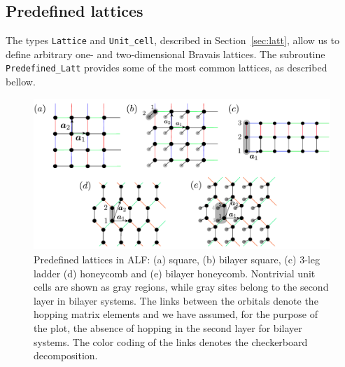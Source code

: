 %
\subsection{Predefined lattices} \label{sec:predefined_lattices}


The types \texttt{Lattice} and \texttt{Unit\_cell}, described in Section~\ref{sec:latt}, allow us to define arbitrary one- and two-dimensional Bravais lattices. The subroutine \texttt{Predefined\_Latt} provides some of the most common lattices, as described bellow.


\begin{figure}
        \begin{center}
                \includegraphics[width=\textwidth]{Figures/Lattices_all.pdf}
               
				
                \caption{Predefined lattices in ALF: (a) square, (b) bilayer square, (c) 3-leg ladder  (d) honeycomb and (e) bilayer honeycomb. Nontrivial unit cells are shown as gray regions, while gray sites belong to the second layer in bilayer systems.   The links between the orbitals denote the hopping matrix elements and we have assumed, for the purpose of the plot,  the absence of hopping in the second layer for bilayer systems. The color coding of the links denotes the checkerboard decomposition. }
                \label{fig_predefined_lattices}
        \end{center}
\end{figure}


